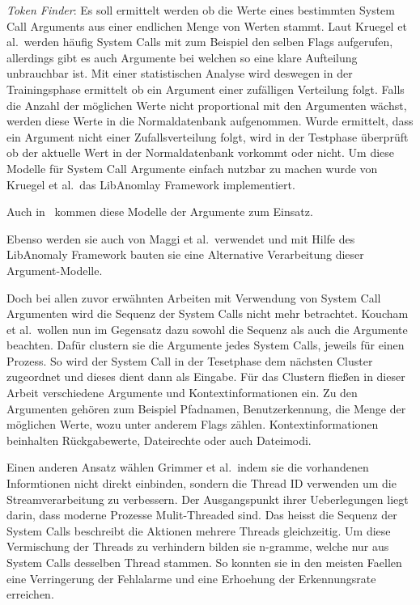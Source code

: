         \textit{Token Finder}: Es soll ermittelt werden ob die Werte eines bestimmten System Call Arguments aus einer endlichen Menge von Werten stammt.
        Laut Kruegel et al.\ werden häufig System Calls mit zum Beispiel den selben Flags aufgerufen, allerdings gibt es auch Argumente bei welchen so eine klare Aufteilung unbrauchbar ist.
        Mit einer statistischen Analyse wird deswegen in der Trainingsphase ermittelt ob ein Argument einer zufälligen Verteilung folgt.
        Falls die Anzahl der möglichen Werte nicht proportional mit den Argumenten wächst, werden diese Werte in die Normaldatenbank aufgenommen.
        Wurde ermittelt, dass ein Argument nicht einer Zufallsverteilung folgt, wird in der Testphase überprüft ob der aktuelle Wert in der Normaldatenbank vorkommt oder nicht.
        Um diese Modelle für System Call Argumente einfach nutzbar zu machen wurde von Kruegel et al.\ das LibAnomlay Framework implementiert.~\cite{ARGUMENTS}

        Auch in~\cite{ARGUMENTS2} kommen diese Modelle der Argumente zum Einsatz.
        
        Ebenso werden sie auch von Maggi et al.\ verwendet und mit Hilfe des LibAnomaly Framework bauten sie eine Alternative Verarbeitung dieser Argument-Modelle.~\cite{MAGGI}

        {\color{red}Doch bei allen zuvor erwähnten Arbeiten mit Verwendung von System Call Argumenten wird die Sequenz der System Calls nicht mehr betrachtet.
        Koucham et al.\ wollen nun im Gegensatz dazu sowohl die Sequenz als auch die Argumente beachten.
        Dafür clustern sie die Argumente jedes System Calls, jeweils für einen Prozess.
        So wird der System Call in der Tesetphase dem nächsten Cluster zugeordnet und dieses dient dann als Eingabe.
        Für das Clustern fließen in dieser Arbeit verschiedene Argumente und Kontextinformationen ein.
        Zu den Argumenten gehören zum Beispiel Pfadnamen, Benutzerkennung, die Menge der möglichen Werte, wozu unter anderem Flags zählen.
        Kontextinformationen beinhalten Rückgabewerte, Dateirechte oder auch Dateimodi.~\cite{ARGUMENTCLUSTERKOUCHAM2015}}

        Einen anderen Ansatz wählen Grimmer et al.\ indem sie die vorhandenen Informtionen nicht direkt einbinden, sondern die Thread ID verwenden um die Streamverarbeitung zu verbessern.
        Der Ausgangspunkt ihrer Ueberlegungen liegt darin, dass moderne Prozesse Mulit-Threaded sind.
        Das heisst die Sequenz der System Calls beschreibt die Aktionen mehrere Threads gleichzeitig.
        Um diese Vermischung der Threads zu verhindern bilden sie n-gramme, welche nur aus System Calls desselben Thread stammen.
        So konnten sie in den meisten Faellen eine Verringerung der Fehlalarme und eine Erhoehung der Erkennungsrate erreichen.\cite{IDSTHREADGRIMMER2021}

